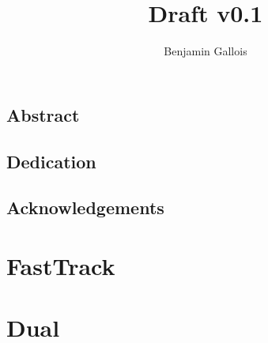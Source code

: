 \documentclass[12pt,a4paper]{report}
\title{Draft v0.1}
\author{Benjamin Gallois}
\begin{document}
\maketitle
\chapter*{Abstract}

\chapter*{Dedication}

\chapter*{Acknowledgements}

\tableofcontents

\part{FastTrack}


\part{Dual}




\end{document}
